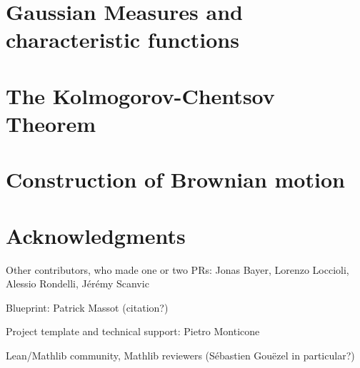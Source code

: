 \documentclass[lean]{AFM}
\begin{document}
\section{Gaussian Measures and characteristic functions}


\section{The Kolmogorov-Chentsov Theorem}
\label{S:continuity}



\section{Construction of Brownian motion}
\label{S:BM}


\section*{Acknowledgments}

Other contributors, who made one or two PRs: Jonas Bayer, Lorenzo Loccioli, Alessio Rondelli, Jérémy Scanvic

Blueprint: Patrick Massot (citation?)

Project template \cite{Monticone_LeanProject_2025} and technical support: Pietro Monticone

Lean/Mathlib community, Mathlib reviewers (Sébastien Gouëzel in particular?)


\printbibliography
\end{document}
